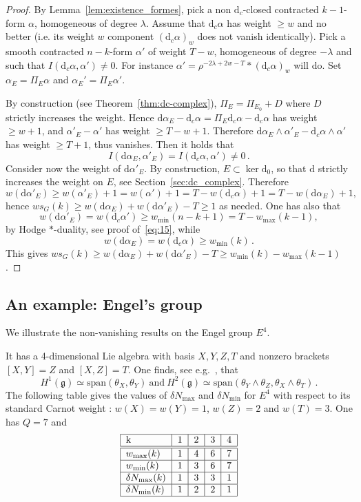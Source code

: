 \documentclass[11pt]{article}
\theoremstyle{definition}
\numberwithin{equation}{section}
\numberwithin{figure}{section}
\numberwithin{table}{section}
\newcommand{\dd}{\mathrm{d}}
\newcommand{\dalpha}{\dd \alpha}
\begin{document}
\begin{proof}
By Lemma~\ref{lem:existence_formes}, pick a non $\dd_c$-closed contracted $k-1$-form $\alpha$, homogeneous of degree $\lambda$. Assume that $\dd_c\alpha$ has weight $\geq w$ and no better (i.e. its weight $w$ component $(\dd_c \alpha)_w$ does not vanish identically). Pick a smooth contracted $n-k$-form $\alpha'$ of weight $T-w$, homogeneous of degree $-\lambda$ and such that $I(\dd_c\alpha,\alpha')\not=0$. For instance $\alpha'= \rho^{-2\lambda+2w-T} * (\dd_c\alpha)_w$ will do. Set $\alpha_E = \Pi_E \alpha$ and $\alpha_E'= \Pi_E \alpha'$.

By construction (see Theorem~\ref{thm:dc-complex}), $\Pi_E = \Pi_{E_0}+ D$ where $D$ strictly increases the weight. Hence $\dalpha_E - \dd_c \alpha= \Pi_E \dd_c \alpha - \dd_c\alpha$ has weight $\geq w +1$, and $\alpha'_E - \alpha'$ has weight $\geq T-w + 1$. Therefore $\dalpha_E \wedge \alpha'_E - \dd_c \alpha \wedge \alpha'$ has weight $\geq T+1$, thus vanishes. Then it holds that
\[
I(\dalpha_E, \alpha'_E) = I(\dd_c \alpha, \alpha') \not=0 \,.
\]
Consider now the weight of $\dalpha'_E$. By construction, $E \subset \ker \dd_0$, so that $\dd$ strictly increases the weight on $E$, see Section~\ref{sec:dc_complex}. Therefore
\[
w(\dalpha'_E) \geq w(\alpha'_E) + 1 = w(\alpha')+ 1 = T - w(\dd_c
\alpha) + 1 = T -w(\dalpha_E) + 1,
\]
hence $ws_G(k) \geq w(\dalpha_E) + w (\dalpha'_E) - T \geq 1 $ as needed. One has also that
\[
w(\dalpha'_E) = w (\dd_c \alpha') \geq w_{\min}(n-k+1) = T - w_{\max}(k-1),
\]
by Hodge $*$-duality, see proof of~\eqref{eq:15}, while
\[
w(\dalpha_E) = w (\dd_c \alpha) \geq w_{\min}(k) \,.
\]
This gives $ws_G(k) \geq w(\dalpha_E) + w (\dalpha'_E) - T \geq w_{\min}(k) - w_{\max}(k-1)$.
\end{proof}


\subsection{An example: Engel's group}\label{sec:engels-group}

We illustrate the non-vanishing results on the Engel group $E^4$.

It has a 4-dimensional Lie algebra with basis $X,Y,Z,T$ and nonzero brackets $[X,Y]=Z$ and $[X,Z]=T$. One finds, see e.g.~\cite[Section~2.3]{Rumin_TSG}, that
\[
H^1(\mathfrak{g}) \simeq \mathrm{span}(\theta_X, \theta_Y) \
\mathrm{and} \ H^2(\mathfrak{g}) \simeq \mathrm{span}(\theta_Y \wedge
\theta_Z, \theta_X \wedge \theta_T) \,.
\]
The following table gives the values of $\delta N_{\max}$ and $\delta N_{\min}$ for $E^4$ with respect to its standard Carnot weight : $w(X)= w(Y) =1$, $w(Z)= 2$ and $w(T) = 3$. One has $Q=7$ and
\[
\begin{tabular}{|l|c|c|c|c|}
\hline k & 1 & 2 & 3 & 4 \\
\hline\hline $w_{\max}(k)$ & 1 & 4 & 6 & 7 \\
\hline $w_{\min}(k)$ & 1 & 3 & 6 & 7 \\
\hline $\delta N_{\max}(k)$ & 1 & 3 & 3 & 1 \\
\hline $\delta N_{\min}(k)$ & 1 & 2 & 2 & 1 \\
\hline
\end{tabular}
\]
\end{document}
